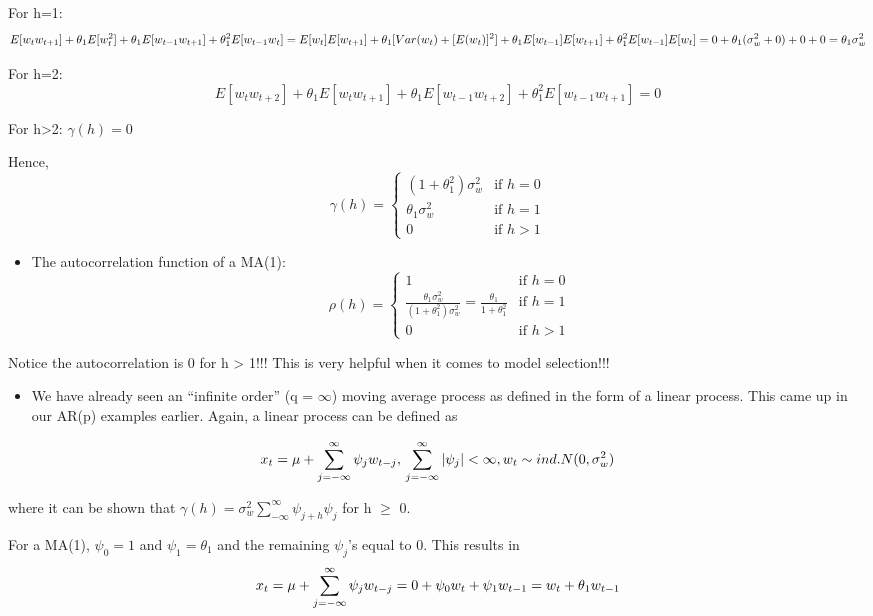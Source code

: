 \documentclass[
]{book}
\providecommand{\tightlist}{%
  \setlength{\itemsep}{0pt}\setlength{\parskip}{0pt}}
\theoremstyle{definition}
\theoremstyle{definition}
\theoremstyle{definition}
\theoremstyle{definition}
\theoremstyle{remark}
\begin{document}
For h=1:
\[E[w_tw_{t+1}] + \theta_1E[w_t^2] + \theta_1E[w_{t-1}w_{t+1}] + \theta_1^2E[w_{t-1}w_t]\\
= E[w_t]E[w_{t+1}] + \theta_1[Var(w_t) + [E(w_t)]^2]
+ \theta_1E[w_{t-1}]E[w_{t+1}] +  \theta_1^2E[w_{t-1}]E[w_t]\\
= 0 + \theta_1(\sigma_w^2+0) + 0 +  0
= \theta_1\sigma_w^2\]

For h=2:
\[E[w_tw_{t+2}]+\theta_1E[w_tw_{t+1}]+\theta_1E[w_{t-1}w_{t+2}]+\theta_1^2E[w_{t-1}w_{t+1}]=0\]

For h\textgreater2: \(\gamma(h)=0\)

Hence,
\[
\gamma(h)=
\begin{cases}
    (1+\theta_1^2)\sigma_w^2 & \text{if } h=0 \\
    \theta_1\sigma_w^2 & \text{if } h=1 \\
    0 & \text{if } h>1
\end{cases}
\]

\begin{itemize}
\tightlist
\item
  The autocorrelation function of a MA(1):
  \[
  \rho(h)=
  \begin{cases}
    1 & \text{if } h=0 \\
    \frac{\theta_1\sigma_w^2}{(1+\theta_1^2)\sigma_w^2}=\frac{\theta_1}{1+\theta_1^2} & \text{if } h=1 \\
    0 & \text{if } h>1
  \end{cases}
  \]
\end{itemize}

Notice the autocorrelation is 0 for h \textgreater{} 1!!! This is very helpful when it comes to model selection!!!

\begin{itemize}
\tightlist
\item
  We have already seen an ``infinite order'' (q = \(\infty\)) moving average process as defined in the form of a linear process. This came up in our AR(p) examples earlier. Again, a linear process can be defined as
\end{itemize}

\[ x_t=\mu+\sum_{j=-\infty}^{\infty}\psi_jw_{t-j},\\
\sum_{j=-\infty}^{\infty} |\psi_j|<\infty,\\ 
w_t \sim ind. N(0, \sigma_w^2)\]

where it can be shown that \(\gamma(h)=\sigma_w^2\sum_{-\infty}^{\infty}\psi_{j+h}\psi_j\) for h \(\ge\) 0.

For a MA(1), \(\psi_0 = 1\) and \(\psi_1 = \theta_1\) and the remaining \(\psi_j\)'s equal to 0. This results in \[x_t=\mu+\sum_{j=-\infty}^{\infty}\psi_jw_{t-j}\\
=0+\psi_0w_t+\psi_1w_{t-1}=w_t+\theta_1w_{t-1}\]
\end{document}
